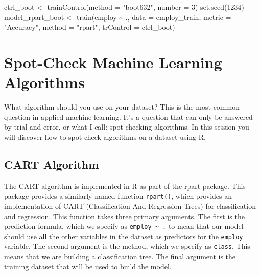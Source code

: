 \documentclass[
]{book}
\newenvironment{Shaded}{\begin{snugshade}}{\end{snugshade}}
\newcommand{\AttributeTok}[1]{\textcolor[rgb]{0.77,0.63,0.00}{#1}}
\newcommand{\DecValTok}[1]{\textcolor[rgb]{0.00,0.00,0.81}{#1}}
\newcommand{\FunctionTok}[1]{\textcolor[rgb]{0.00,0.00,0.00}{#1}}
\newcommand{\NormalTok}[1]{#1}
\newcommand{\OtherTok}[1]{\textcolor[rgb]{0.56,0.35,0.01}{#1}}
\newcommand{\SpecialCharTok}[1]{\textcolor[rgb]{0.00,0.00,0.00}{#1}}
\newcommand{\StringTok}[1]{\textcolor[rgb]{0.31,0.60,0.02}{#1}}
\begin{document}
\begin{Shaded}
\begin{Highlighting}[]
\NormalTok{ctrl\_boot }\OtherTok{\textless{}{-}} \FunctionTok{trainControl}\NormalTok{(}\AttributeTok{method =} \StringTok{"boot632"}\NormalTok{, }\AttributeTok{number =} \DecValTok{3}\NormalTok{)}
\FunctionTok{set.seed}\NormalTok{(}\DecValTok{1234}\NormalTok{)}
\NormalTok{model\_rpart\_boot }\OtherTok{\textless{}{-}} \FunctionTok{train}\NormalTok{(employ }\SpecialCharTok{\textasciitilde{}}\NormalTok{ .,}
                           \AttributeTok{data =}\NormalTok{ employ\_train,}
                           \AttributeTok{metric =} \StringTok{"Accuracy"}\NormalTok{,}
                           \AttributeTok{method =} \StringTok{"rpart"}\NormalTok{,}
                           \AttributeTok{trControl =}\NormalTok{ ctrl\_boot)}
\end{Highlighting}
\end{Shaded}

\hypertarget{spot-check-machine-learning-algorithms}{%
\section{Spot-Check Machine Learning Algorithms}\label{spot-check-machine-learning-algorithms}}

What algorithm should you use on your dataset? This is the most common question in applied machine learning. It's a question that can only be answered by trial and error, or what I call: spot-checking algorithms. In this session you will discover how to spot-check algorithms on a dataset using R.

\hypertarget{cart-algorithm}{%
\subsection{CART Algorithm}\label{cart-algorithm}}

The CART algorithm is implemented in R as part of the rpart package. This package provides a similarly named function \texttt{rpart()}, which provides an implementation of CART (Classification And Regression Trees) for classification and regression.
This function takes three primary arguments. The first is the
prediction formula, which we specify as \texttt{employ\ \textasciitilde{}\ .} to mean that our model should use all the other variables in the dataset as predictors for the \texttt{employ} variable. The second argument is the method, which we specify as \texttt{class}. This means that we are building a classification tree. The final argument is the training dataset that will be used to build the model.
\end{document}
